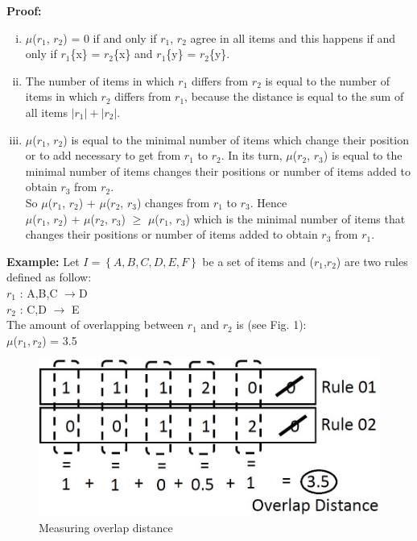 \documentclass[preprint,12pt]{elsarticle}
\begin{document}
\textbf{Proof:}
\begin{enumerate}[i)]
\item  $\mu$($r_1$, $r_2$) = 0 if and only if $r_1$, $r_2$ agree in all items and this happens if
and only if $r_1$\{x\} = $r_2$\{x\} and $r_1$\{y\} = $r_2$\{y\}.
\item  The number of items in which $r_1$ differs from $r_2$ is equal to the number of
items in which $r_2$ differs from $r_1$, because the distance is equal to the sum of all items $\left|r_1\right|+\left|r_2\right|$.
\item  $\mu$($r_1$, $r_2$) is equal to the minimal number of items which change their position or to add necessary to get
from $r_1$ to $r_2$. In its turn, $\mu$($r_2$, $r_3$) is equal to the minimal number
of items changes their positions or number of items added
to obtain  $r_3$ from $r_2$.\\
So $\mu$($r_1$, $r_2$) + $\mu$($r_2$, $r_3$) changes from $r_1$ to $r_3$. Hence \\
$\mu$($r_1$, $r_2$) + $\mu$($r_2$, $r_3$) $\geq$ $\mu$($r_1$, $r_3$) which is the minimal number of
items that changes their positions or number of items added
to obtain  $r_3$ from $r_1$.
\end{enumerate}
\textbf{Example:}
Let $I=\left\{A,B,C,D,E,F\right\}$ be a set of items and ($r_{1}$,$r_{2}$) are two rules defined as follow:\\
$r_{1}$ : A,B,C $\rightarrow $D\\
$r_{2}$ : C,D $\rightarrow$ E \\
The amount of overlapping between $r_{1}$ and $r_{2}$ is (see Fig. 1):\\
$\mu$($r_{1},r_{2}$) = 3.5 
\begin{figure}[h]
\begin{center}
\includegraphics[scale=0.5]{3.jpg}
\end{center}
\label{Fig1}
\caption{Measuring overlap distance}
\end{figure}
\end{document}
